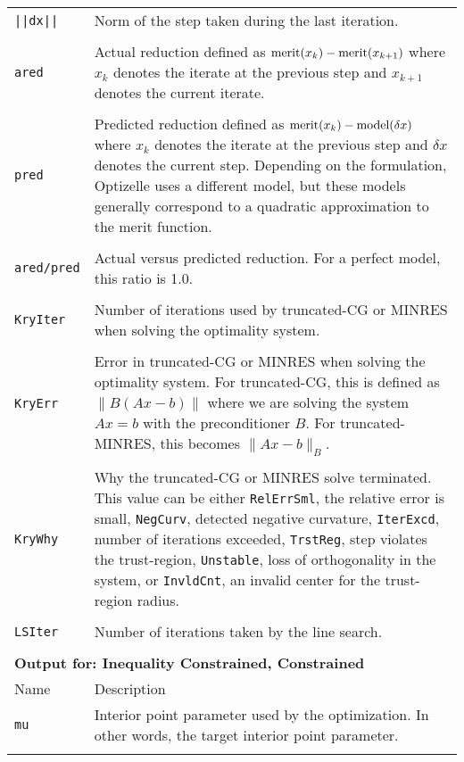 \documentclass{report}
\begin{document}
\begin{longtable}{lp{}}
\texttt{||dx||} & Norm of the step taken during the last iteration. \\
\\
\texttt{ared} & Actual reduction defined as $\textnormal{merit}(x_k)-\textnormal{merit}(x_{k+1})$ where $x_k$ denotes the iterate at the previous step and $x_{k+1}$ denotes the current iterate.\\
\\
\texttt{pred} & Predicted reduction defined as $\textnormal{merit}(x_k)-\textnormal{model}(\delta x)$ where $x_k$ denotes the iterate at the previous step and $\delta x$ denotes the current step.  Depending on the formulation, Optizelle uses a different model, but these models generally correspond to a quadratic approximation to the merit function.\\
\\
\texttt{ared/pred} & Actual versus predicted reduction.  For a perfect model, this ratio is 1.0.\\
\\
\texttt{KryIter} & Number of iterations used by truncated-CG or MINRES when solving the optimality system.\\
\\
\texttt{KryErr} & Error in truncated-CG or MINRES when solving the optimality system.  For truncated-CG, this is defined as $\|B(Ax-b)\|$ where we are solving the system $Ax=b$ with the preconditioner $B$.  For truncated-MINRES, this becomes $\|Ax-b\|_B$.\\
\\
\texttt{KryWhy} & Why the truncated-CG or MINRES solve terminated.  This value can be either \texttt{RelErrSml}, the relative error is small, \texttt{NegCurv}, detected negative curvature, \texttt{IterExcd}, number of iterations exceeded, \texttt{TrstReg}, step violates the trust-region, \texttt{Unstable}, loss of orthogonality in the system, or \texttt{InvldCnt}, an invalid center for the trust-region radius.\\
\\
\texttt{LSIter} & Number of iterations taken by the line search.\\
\\
\multicolumn{2}{p{\textwidth}}{\bf Output for: Inequality Constrained, Constrained}\\
Name & Description\\
\texttt{mu} & Interior point parameter used by the optimization.  In other words, the target interior point parameter.\\
\\

\end{longtable}
\end{document}
